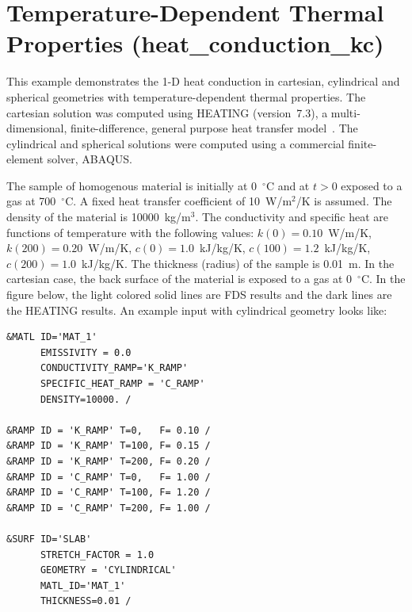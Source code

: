 \documentclass[11pt]{book}
\begin{document}
\clearpage

\section{Temperature-Dependent Thermal Properties (\texorpdfstring{{\bf heat\_conduction\_kc}}{heat\_conduction\_kc})}

This example demonstrates the 1-D heat conduction in cartesian, cylindrical and spherical geometries with temperature-dependent thermal properties.
The cartesian solution was computed using HEATING (version~7.3), a multi-dimensional, finite-difference, general purpose heat transfer
model~\cite{Childs}. The cylindrical and spherical solutions were computed using a commercial finite-element solver, ABAQUS.

The sample of homogenous material is initially at 0~$^\circ$C and at $t>0$ exposed to a gas at 700~$^\circ$C. A fixed heat transfer coefficient of
10~W/m$^2$/K is assumed. The density of the material is 10000~kg/m$^3$. The conductivity and specific heat are functions of temperature with the
following values: $k(0)=0.10$~W/m/K, $k(200)=0.20$~W/m/K, $c(0)=1.0$~kJ/kg/K, $c(100)=1.2$~kJ/kg/K, $c(200)=1.0$~kJ/kg/K. The thickness (radius) of
the sample is 0.01~m. In the cartesian case, the back surface of the material is exposed to a gas at 0~$^\circ$C. In the figure below, the light colored solid
lines are FDS results and the dark lines are the HEATING results. An example input with cylindrical geometry looks like:

\scriptsize
\begin{verbatim}
&MATL ID='MAT_1'
      EMISSIVITY = 0.0
      CONDUCTIVITY_RAMP='K_RAMP'
      SPECIFIC_HEAT_RAMP = 'C_RAMP'
      DENSITY=10000. /

&RAMP ID = 'K_RAMP' T=0,   F= 0.10 /
&RAMP ID = 'K_RAMP' T=100, F= 0.15 /
&RAMP ID = 'K_RAMP' T=200, F= 0.20 /
&RAMP ID = 'C_RAMP' T=0,   F= 1.00 /
&RAMP ID = 'C_RAMP' T=100, F= 1.20 /
&RAMP ID = 'C_RAMP' T=200, F= 1.00 /

&SURF ID='SLAB'
      STRETCH_FACTOR = 1.0
      GEOMETRY = 'CYLINDRICAL'
      MATL_ID='MAT_1'
      THICKNESS=0.01 /
\end{verbatim} \normalsize
\end{document}
